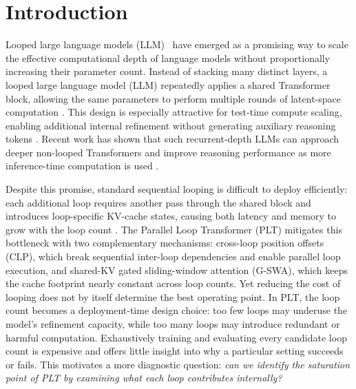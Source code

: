 \section{Introduction}
Looped large language models (LLM)~\cite{yang2025codesurvey,wu2025parallel} have emerged as a promising way to scale the effective computational depth of language models without proportionally increasing their parameter count. Instead of stacking many distinct layers, a looped large language model (LLM) repeatedly applies a shared Transformer block, allowing the same parameters to perform multiple rounds of latent-space computation \citep{dehghani2018universal,giannou2023looped,yang2023looped}. This design is especially attractive for test-time compute scaling, enabling additional internal refinement without generating auxiliary reasoning tokens \citep{geiping2025scaling}. Recent work has shown that such recurrent-depth LLMs can approach deeper non-looped Transformers and improve reasoning performance as more inference-time computation is used \citep{geiping2025scaling,yang2026stabilizing,schwethelm2026how}.

Despite this promise, standard sequential looping is difficult to deploy efficiently: each additional loop requires another pass through the shared block and introduces loop-specific KV-cache states, causing both latency and memory to grow with the loop count \citep{vendrell2026memoryefficient}. The Parallel Loop Transformer (PLT) \citep{wu2025parallel} mitigates this bottleneck with two complementary mechanisms: cross-loop position offsets (CLP), which break sequential inter-loop dependencies and enable parallel loop execution, and shared-KV gated sliding-window attention (G-SWA), which keeps the cache footprint nearly constant across loop counts. Yet reducing the cost of looping does not by itself determine the best operating point. In PLT, the loop count becomes a deployment-time design choice: too few loops may underuse the model's refinement capacity, while too many loops may introduce redundant or harmful computation. Exhaustively training and evaluating every candidate loop count is expensive and offers little insight into why a particular setting succeeds or fails. This motivates a more diagnostic question: \emph{can we identify the saturation point of PLT by examining what each loop contributes internally?}


